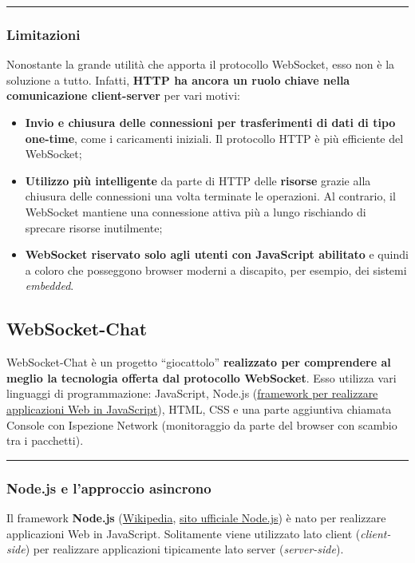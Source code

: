 \documentclass[a4paper]{article}
\newcommand{\longline}{\noindent\rule{\textwidth}{0.4pt}}
\newcommand{\dquotes}[1]{``#1''}
\begin{document}
	\longline
	
	\subsubsection{Limitazioni}
	
	Nonostante la grande utilità che apporta il protocollo WebSocket, esso non è la soluzione a tutto. Infatti, \textbf{HTTP ha ancora un ruolo chiave nella comunicazione client-server} per vari motivi:
	\begin{itemize}
		\item \textbf{Invio e chiusura delle connessioni per trasferimenti di dati di tipo one-time}, come i caricamenti iniziali. Il protocollo HTTP è più efficiente del WebSocket;
		
		\item \textbf{Utilizzo più intelligente} da parte di HTTP delle \textbf{risorse} grazie alla chiusura delle connessioni una volta terminate le operazioni. Al contrario, il WebSocket mantiene una connessione attiva più a lungo rischiando di sprecare risorse inutilmente;
		
		\item \textbf{WebSocket riservato solo agli utenti con JavaScript abilitato} e quindi a coloro che posseggono browser moderni a discapito, per esempio, dei sistemi \emph{embedded}.
	\end{itemize}\newpage

	\subsection{WebSocket-Chat}
	
	WebSocket-Chat è un progetto \dquotes{giocattolo} \textbf{realizzato per comprendere al meglio la tecnologia offerta dal protocollo WebSocket}. Esso utilizza vari linguaggi di programmazione: JavaScript, Node.js (\href{https://it.wikipedia.org/wiki/Node.js}{framework per realizzare applicazioni Web in JavaScript}), HTML, CSS e una parte aggiuntiva chiamata Console con Ispezione Network (monitoraggio da parte del browser con scambio tra i pacchetti).
	
	\longline
	
	\subsubsection{Node.js e l'approccio asincrono}
	
	Il framework \textcolor{Red3}{\textbf{Node.js}} (\href{https://it.wikipedia.org/wiki/Node.js}{Wikipedia}, \href{https://nodejs.org/it}{sito ufficiale Node.js}) è nato per realizzare applicazioni Web in JavaScript. Solitamente viene utilizzato lato client (\emph{client-side}) per realizzare applicazioni tipicamente lato server (\emph{server-side}).\newline
	
\end{document}

